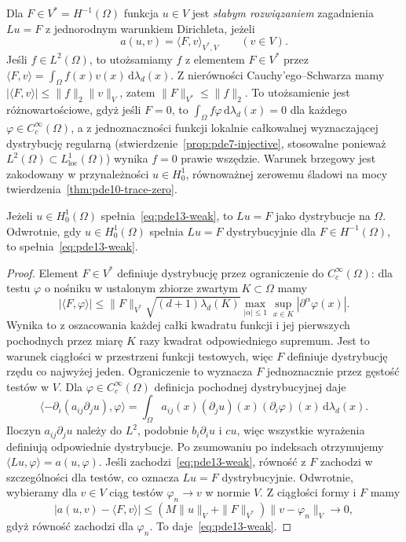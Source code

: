 \begin{definicja}
\label{def:pde13-weak}
Dla $F\in V^*=H^{-1}(\Omega)$ funkcja $u\in V$ jest
\emph{słabym rozwiązaniem} zagadnienia $Lu=F$ z jednorodnym
warunkiem Dirichleta, jeżeli
\begin{equation}\label{eq:pde13-weak}
 a(u,v)=\langle F,v\rangle_{V^*,V}\qquad(v\in V).
\end{equation}
Jeśli $f\in L^2(\Omega)$, to utożsamiamy $f$ z elementem $F\in V^*$
przez $\langle F,v\rangle=\int_\Omega f(x)v(x)\,\mathrm d\lambda_d(x)$.
Z nierówności Cauchy'ego--Schwarza mamy
$|\langle F,v\rangle|\le\|f\|_2\|v\|_V$, zatem
$\|F\|_{V^*}\le\|f\|_2$. To utożsamienie jest różnowartościowe,
gdyż jeśli $F=0$, to $\int_\Omega f\varphi\,\mathrm d\lambda_d(x)=0$
dla każdego $\varphi\in C_c^\infty(\Omega)$, a z jednoznaczności
funkcji lokalnie całkowalnej wyznaczającej dystrybucję regularną
(stwierdzenie~\ref{prop:pde7-injective}, stosowalne ponieważ
$L^2(\Omega)\subset L^1_{\mathrm{loc}}(\Omega)$)
wynika $f=0$ prawie wszędzie.
Warunek brzegowy jest zakodowany w przynależności $u\in H_0^1$,
równoważnej zerowemu śladowi na mocy
twierdzenia~\ref{thm:pde10-trace-zero}.
\end{definicja}

\begin{stwierdzenie}
\label{prop:pde13-distributional}
Jeżeli $u\in H_0^1(\Omega)$ spełnia~\eqref{eq:pde13-weak}, to
$Lu=F$ jako dystrybucje na $\Omega$. Odwrotnie, gdy
$u\in H_0^1(\Omega)$ spełnia $Lu=F$ dystrybucyjnie dla
$F\in H^{-1}(\Omega)$, to spełnia~\eqref{eq:pde13-weak}.
\end{stwierdzenie}
\begin{proof}
Element $F\in V^*$ definiuje dystrybucję przez ograniczenie
do $C_c^\infty(\Omega)$: dla testu $\varphi$ o nośniku
w ustalonym zbiorze zwartym $K\subset\Omega$ mamy
\[
 |\langle F,\varphi\rangle|
 \le\|F\|_{V^*}\sqrt{(d+1)\lambda_d(K)}
 \max_{|\alpha|\le1}\sup_{x\in K}|\partial^\alpha\varphi(x)|.
\]
Wynika to z oszacowania każdej całki kwadratu funkcji
i jej pierwszych pochodnych przez miarę $K$ razy
kwadrat odpowiedniego supremum. Jest to warunek ciągłości
w przestrzeni funkcji testowych, więc $F$ definiuje
dystrybucję rzędu co najwyżej jeden.
Ograniczenie to wyznacza $F$ jednoznacznie przez gęstość testów w $V$.
Dla $\varphi\in C_c^\infty(\Omega)$ definicja pochodnej
dystrybucyjnej daje
\[
 \langle-\partial_i(a_{ij}\partial_j u),\varphi\rangle
 =\int_\Omega a_{ij}(x)(\partial_j u)(x)(\partial_i\varphi)(x)
 \,\mathrm d\lambda_d(x).
\]
Iloczyn $a_{ij}\partial_j u$ należy do $L^2$, podobnie
$b_i\partial_i u$ i $cu$, więc wszystkie wyrażenia definiują
odpowiednie dystrybucje. Po zsumowaniu po indeksach otrzymujemy
$\langle Lu,\varphi\rangle=a(u,\varphi)$.
Jeśli zachodzi~\eqref{eq:pde13-weak}, równość z $F$ zachodzi
w szczególności dla testów, co oznacza $Lu=F$ dystrybucyjnie.
Odwrotnie, wybieramy dla $v\in V$ ciąg testów $\varphi_n\to v$
w normie $V$. Z ciągłości formy i $F$ mamy
\[
 |a(u,v)-\langle F,v\rangle|
 \le (M\|u\|_V+\|F\|_{V^*})\|v-\varphi_n\|_V\longrightarrow0,
\]
gdyż równość zachodzi dla $\varphi_n$. To daje~\eqref{eq:pde13-weak}.
\end{proof}

